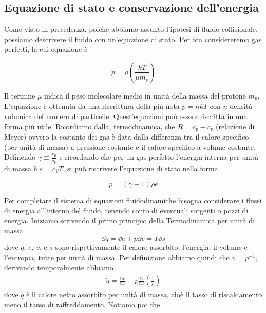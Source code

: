 \subsection{Equazione di stato e conservazione dell'energia} \label{sec:ConservazioneEnergia}
Come visto in precedenza, poichè abbiamo assunto l'ipotesi di fluido collisionale, possiamo descrivere il fluido con un'equazione di stato. Per ora considereremo gas perfetti, la cui equazione è 
\begin{EQ}
\begin{equation}
p = \rho \left(\frac{k T}{\mu m_\mathrm{p}} \right) 
\end{equation}
\end{EQ}
Il termine $\mu$ indica il peso molecolare medio in unità della massa del protone $m_p$. L'equazione è ottenuta da una riscrittura della più nota $p=nkT$ con $n$ densità volumica del numero di particelle. Quest'equazioni può essere riscritta in una forma più utile. Ricordiamo dalla, termodinamica, che $R=c_p -c_v$ (relazione di Meyer) ovvero la costante dei gas è data dalla differenza tra il calore specifico (per unità di massa) a pressione costante e il calore specifico a volume costante. Definendo $\gamma \equiv \frac{c_p}{c_V}$ e ricordando che per un gas perfetto l'energia interna per unità di massa è $e=c_V T$, si può riscrivere l'equazione di stato nella forma
\begin{EQ}
\begin{equation}
p = (\gamma -1) \rho e \label{eq:GasPerfetti}
\end{equation}
\end{EQ}
Per completare il sistema di equazioni fluidodinamiche bisogna considerare i flussi di energia all'interno del fluido, tenendo conto di eventuali sorgenti o pozzi di energia. Iniziamo scrivendo il primo principio della Termodinamica per unità di massa
\begin{equation}
\dd q = \dd e + p \dd v = T \dd s 
\end{equation}
dove $q$, $e$, $v$, e $s$ sono rispettivamente il calore assorbito, l'energia, il volume e l'entropia, tutte per unità di massa. Per definizione abbiamo quindi che $v=\rho^{-1}$, derivando temporalmente abbiamo
\begin{align}
\dot{q} = \frac{\DD e}{\DD t} + p \frac{\DD}{\DD t} \left( \frac{1}{\rho}\right) \label{eq:EquazioneDiStato1}
\end{align}
dove $\dot{q}$ è il calore netto assorbito per unità di massa, cioè il tasso di riscaldamento meno il tasso di raffreddamento. Notiamo poi che 
